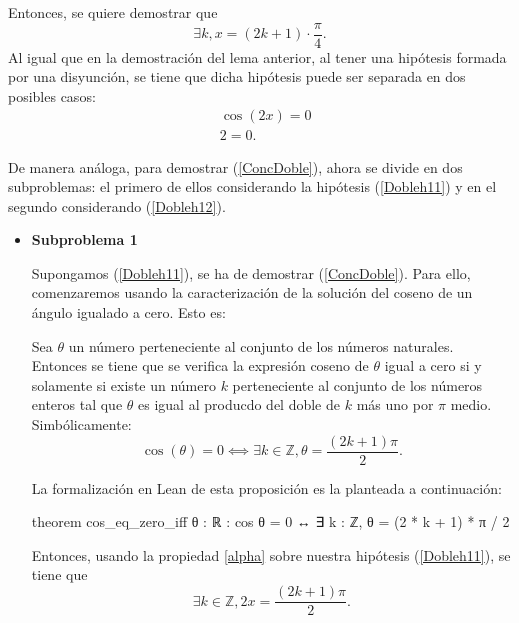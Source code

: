 \begin{demostracion}
  Entonces, se quiere demostrar que
  \begin{equation}\label{ConcDoble}
    ∃ k,x=(2k+1)⋅\frac{π}{4}.
  \end{equation}
  Al igual que en la demostración del lema anterior, al tener una
  hipótesis formada por una disyunción, se tiene que dicha hipótesis
  puede ser separada en dos posibles casos:
  \begin{align}
    &\cos(2x)=0 \label{Dobleh11}\tag{h11}\\
    &2=0. \label{Dobleh12}\tag{h12}
  \end{align}

  De manera análoga, para demostrar (\ref{ConcDoble}), ahora se
  divide en dos subproblemas: el primero de ellos considerando
  la hipótesis (\ref{Dobleh11}) y en el segundo considerando
  (\ref{Dobleh12}).

  \begin{itemize}
  \item \textbf{Subproblema 1}

    Supongamos (\ref{Dobleh11}), se ha de demostrar
    (\ref{ConcDoble}). Para ello, comenzaremos usando la
    caracterización de la solución del coseno de un ángulo
    igualado a cero. Esto es:
    
    \begin{proposicion}\label{alpha}
      Sea \(θ\) un número perteneciente al conjunto de los
      números naturales. Entonces se tiene que se verifica la
      expresión coseno de \(θ \) igual a cero si y solamente si
      existe un número \(k\) perteneciente al conjunto de los
      números enteros tal que \(θ \) es igual al producdo del
      doble de \(k\) más uno por \(π \) medio. Simbólicamente:
    \begin{equation}\label{alpha2}
      \cos(θ)=0 ⟺∃ k ∈ℤ,  θ=\frac{(2k+1)π}{2}.
    \end{equation}
    \end{proposicion}

    La formalización en Lean de esta proposición es la planteada
    a continuación:
    \begin{leancode}
      theorem cos_eq_zero_iff {θ : ℝ} : cos θ = 0 ↔
      ∃ k : ℤ, θ = (2 * k + 1) * π / 2 
    \end{leancode}
    
    Entonces, usando la propiedad \ref{alpha} sobre nuestra
    hipótesis (\ref{Dobleh11}), se tiene que
    \begin{equation}\label{Doble2h11}
      ∃k∈ ℤ, 2x=\frac{(2k+1)π}{2}.
    \end{equation}


\end{itemize}
\end{demostracion}
